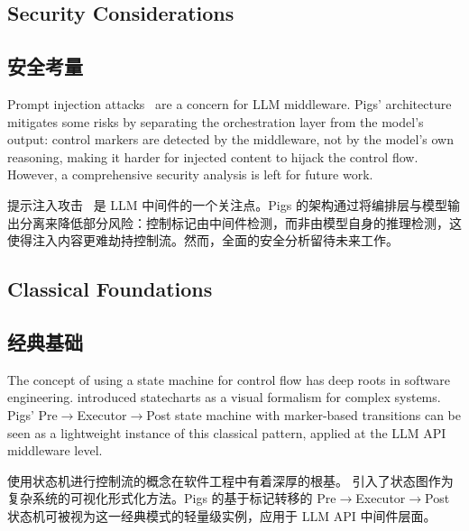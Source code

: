 \subsection{Security Considerations}
\begin{chinese}
\subsection{安全考量}
\end{chinese}

Prompt injection attacks~\citep{greshake2023promptinjection, liu2024promptinjection} are a concern for LLM middleware. Pigs' architecture mitigates some risks by separating the orchestration layer from the model's output: control markers are detected by the middleware, not by the model's own reasoning, making it harder for injected content to hijack the control flow. However, a comprehensive security analysis is left for future work.
\begin{chinese}
提示注入攻击~\citep{greshake2023promptinjection, liu2024promptinjection} 是 LLM 中间件的一个关注点。Pigs 的架构通过将编排层与模型输出分离来降低部分风险：控制标记由中间件检测，而非由模型自身的推理检测，这使得注入内容更难劫持控制流。然而，全面的安全分析留待未来工作。
\end{chinese}

\subsection{Classical Foundations}
\begin{chinese}
\subsection{经典基础}
\end{chinese}

The concept of using a state machine for control flow has deep roots in software engineering. \citet{harel1987statecharts} introduced statecharts as a visual formalism for complex systems. Pigs' Pre$\rightarrow$Executor$\rightarrow$Post state machine with marker-based transitions can be seen as a lightweight instance of this classical pattern, applied at the LLM API middleware level.
\begin{chinese}
使用状态机进行控制流的概念在软件工程中有着深厚的根基。\citet{harel1987statecharts} 引入了状态图作为复杂系统的可视化形式化方法。Pigs 的基于标记转移的 Pre$\rightarrow$Executor$\rightarrow$Post 状态机可被视为这一经典模式的轻量级实例，应用于 LLM API 中间件层面。
\end{chinese}
